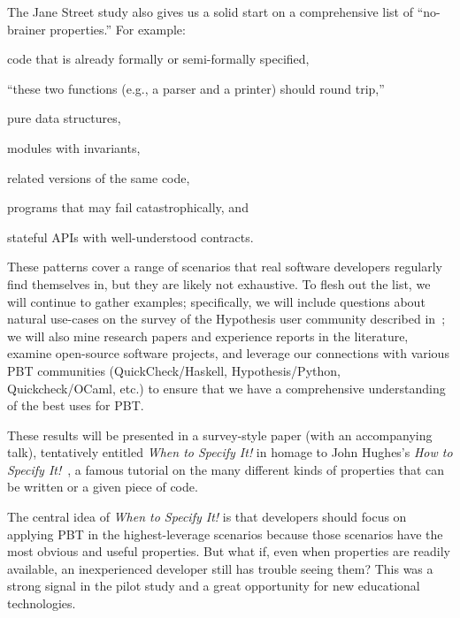 The Jane Street study also gives us a solid start on a comprehensive list of
``no-brainer properties.''  For example:
\begin{enumerate*}[label=(1)]
\item code that is already formally or semi-formally specified,
\item ``these two functions (e.g., a parser and a printer) should
round trip,'' 
\item pure data structures,
\item modules with invariants,
\item related versions of the same code,
\item programs that may fail catastrophically,
and
\item stateful APIs with well-understood contracts.
\end{enumerate*}
These patterns cover a range of
scenarios that real software developers regularly find themselves in, but they
are likely not exhaustive. To flesh out the list, we will continue to
gather examples; specifically, we will include
questions about natural use-cases on the survey of the Hypothesis user
community described in~; we will also mine
research papers and experience reports in the literature,
examine open-source software projects, and leverage our connections with various
PBT communities (QuickCheck/Haskell, Hypothesis/Python, Quickcheck/OCaml, etc.)
to ensure that we have a comprehensive understanding of the best uses for PBT.

These results will be presented in a survey-style paper (with an
accompanying talk), tentatively entitled {\em When to Specify It!} in
homage to John Hughes's {\em How to Specify
  It!}~\cite{HowToSpecifyIt}, a famous tutorial on the many different
kinds of properties that can be written or a given piece of code.


The central idea of {\em When to Specify It!} is that developers should focus on
applying PBT in the highest-leverage scenarios because those scenarios have the
most obvious and useful properties. But what if, even when properties are
readily available, an inexperienced developer still has trouble seeing them?
This was a strong signal in the pilot study and a great opportunity for new
educational technologies.

